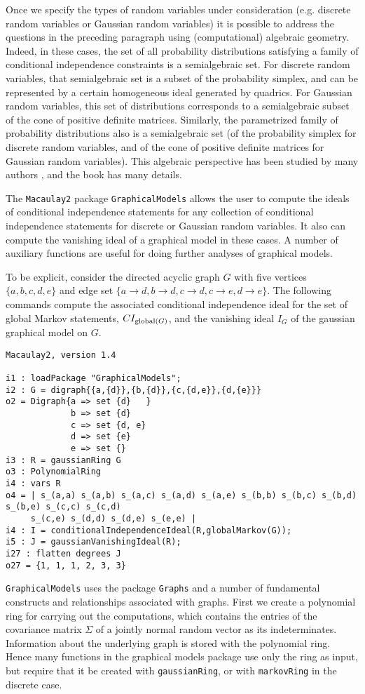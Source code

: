 \documentclass[letterpaper]{article}
\theoremstyle{definition}
\begin{document}
Once we specify the types of random variables under consideration
(e.g. discrete random variables or Gaussian random variables) it
is possible to address the questions in the preceding paragraph
using (computational) algebraic geometry.  Indeed, in these cases,
the set of all probability distributions satisfying a family of 
conditional independence constraints is a semialgebraic set.
For discrete random variables, that semialgebraic set is a subset
of the probability simplex, and can be represented by a certain
homogeneous ideal generated by quadrics.  For Gaussian random variables,
this set of distributions corresponds to a semialgebraic subset
of the cone of positive definite matrices.  Similarly,
the parametrized family of probability distributions also
is a semialgebraic set (of the probability simplex for discrete
random variables, and of the cone of positive definite matrices
for Gaussian random variables).  This algebraic perspective
has been studied by many authors \cite{}, and the book \cite{DSS}
has many details.

The {\tt Macaulay2} package {\tt GraphicalModels} allows the user to compute
the ideals of conditional independence statements for any collection
of conditional independence statements for discrete or Gaussian
random variables.  It also can compute the vanishing ideal of 
a graphical model in these cases.  A number of auxiliary functions
are useful for doing further analyses of graphical models.

To be explicit, consider the directed acyclic graph $G$ with  five
vertices $\{a,b,c,d,e\}$ and edge
set $\{a \to d, b \to d, c \to d, c \to e, d \to e\}$.
The following commands compute the associated conditional
independence ideal for the set of global Markov statements,
$CI_{{\rm global}(G)}$, and 
the vanishing ideal $I_{G}$ of the gaussian graphical model on $G$.

\begin{verbatim}
Macaulay2, version 1.4

i1 : loadPackage "GraphicalModels";
i2 : G = digraph{{a,{d}},{b,{d}},{c,{d,e}},{d,{e}}} 
o2 = Digraph{a => set {d}   }
             b => set {d}
             c => set {d, e}
             d => set {e}
             e => set {}
i3 : R = gaussianRing G
o3 : PolynomialRing
i4 : vars R
o4 = | s_(a,a) s_(a,b) s_(a,c) s_(a,d) s_(a,e) s_(b,b) s_(b,c) s_(b,d) s_(b,e) s_(c,c) s_(c,d)
     s_(c,e) s_(d,d) s_(d,e) s_(e,e) |
i4 : I = conditionalIndependenceIdeal(R,globalMarkov(G));
i5 : J = gaussianVanishingIdeal(R);
i27 : flatten degrees J
o27 = {1, 1, 1, 2, 3, 3}
\end{verbatim}
 {\tt GraphicalModels} uses the package {\tt Graphs} and a number of fundamental constructs and relationships 
associated with graphs.  First we create a polynomial ring
for carrying out the computations, which contains the entries of
the covariance matrix $\Sigma$ of a jointly normal random vector
as its indeterminates.  Information about the underlying graph is stored with the polynomial ring. 
Hence many functions in the graphical models package use only the ring as input, but require that it be created with {\tt gaussianRing}, or with {\tt markovRing} in the discrete case.
\end{document}
